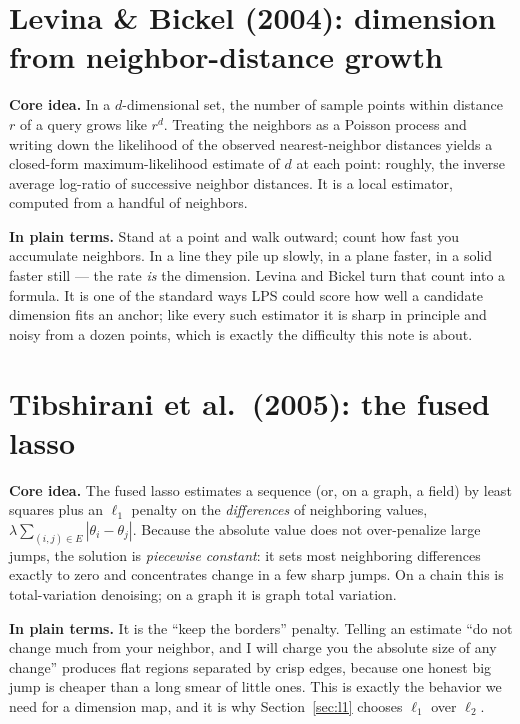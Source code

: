 \documentclass[11pt]{article}
\theoremstyle{definition}
\theoremstyle{remark}
\begin{document}
\section{Levina \& Bickel (2004): dimension from neighbor-distance growth}
\label{app:levinabickel}
\textbf{Core idea.} In a $d$-dimensional set, the number of sample points within
distance $r$ of a query grows like $r^{d}$. Treating the neighbors as a Poisson
process and writing down the likelihood of the observed nearest-neighbor distances
yields a closed-form maximum-likelihood estimate of $d$ at each point: roughly,
the inverse average log-ratio of successive neighbor distances. It is a local
estimator, computed from a handful of neighbors.

\textbf{In plain terms.} Stand at a point and walk outward; count how fast you
accumulate neighbors. In a line they pile up slowly, in a plane faster, in a solid
faster still --- the rate \emph{is} the dimension. Levina and Bickel turn that
count into a formula. It is one of the standard ways LPS could score how well a
candidate dimension fits an anchor; like every such estimator it is sharp in
principle and noisy from a dozen points, which is exactly the difficulty this note
is about.

\section{Tibshirani et al.\ (2005): the fused lasso}
\label{app:fusedlasso}
\textbf{Core idea.} The fused lasso estimates a sequence (or, on a graph, a field)
by least squares plus an $\ell_1$ penalty on the \emph{differences} of neighboring
values, $\lambda\sum_{(i,j)\in E}|\theta_i-\theta_j|$. Because the absolute value
does not over-penalize large jumps, the solution is \emph{piecewise constant}: it
sets most neighboring differences exactly to zero and concentrates change in a few
sharp jumps. On a chain this is total-variation denoising; on a graph it is graph
total variation.

\textbf{In plain terms.} It is the ``keep the borders'' penalty. Telling an
estimate ``do not change much from your neighbor, and I will charge you the
absolute size of any change'' produces flat regions separated by crisp edges,
because one honest big jump is cheaper than a long smear of little ones. This is
exactly the behavior we need for a dimension map, and it is why
Section~\ref{sec:l1} chooses $\ell_1$ over $\ell_2$.
\end{document}
